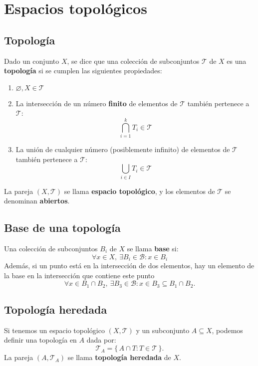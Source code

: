 \documentclass[12pt]{article}
\begin{document}
\section*{Espacios topológicos}
\subsection*{Topología}
\begin{tcolorbox}[definitionstyle]
Dado un conjunto \( X \), se dice que una colección de subconjuntos \( \mathcal{T} \) de \( X \) es una \textbf{topología} si se cumplen las siguientes propiedades:

\begin{enumerate}
    \item \( \varnothing, X \in \mathcal{T} \)
    \item La intersección de un número \textbf{finito} de elementos de \( \mathcal{T} \) también pertenece a \( \mathcal{T} \):
    \[
        \bigcap_{i=1}^{k} T_i \in \mathcal{T}
    \]
    \item La unión de cualquier número (posiblemente infinito) de elementos de \( \mathcal{T} \) también pertenece a \( \mathcal{T} \):
    \[
        \bigcup_{i \in I} T_i \in \mathcal{T}
    \]
\end{enumerate}

La pareja \( (X, \mathcal{T}) \) se llama \textbf{espacio topológico}, y los elementos de \( \mathcal{T} \) se denominan \textbf{abiertos}.
\end{tcolorbox}

\subsection*{Base de una topología}
\begin{tcolorbox}[definitionstyle]
Una colección de subconjuntos \( B_i \) de \( X \) se llama \textbf{base} si:
\[
\forall x \in X,\ \exists B_i \in \mathcal{B} : x \in B_i
\]
Además, si un punto está en la intersección de dos elementos, hay un elemento de la base en la
intersección que contiene este punto 
\[
\forall x \in B_1 \cap B_2,\ \exists B_3 \in \mathcal{B} : x \in B_3 \subseteq B_1 \cap B_2.
\]
\end{tcolorbox}
\subsection*{Topología heredada}
\begin{tcolorbox}[definitionstyle]
Si tenemos un espacio topológico \( (X, \mathcal{T}) \) y un subconjunto \( A \subseteq X \), podemos definir una topología en \( A \) dada por:
\[
\mathcal{T}_A = \{\, A \cap T : T \in \mathcal{T} \,\}.
\]
La pareja \( (A, \mathcal{T}_A) \) se llama \textbf{topología heredada} de \( X \).
\end{tcolorbox}
\end{document}
